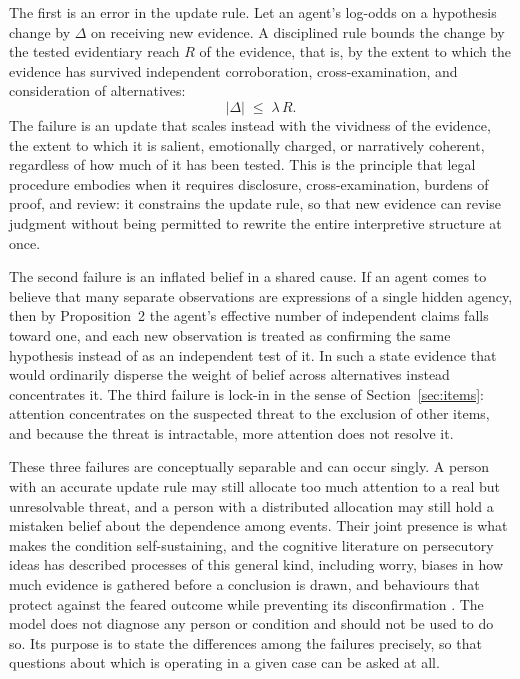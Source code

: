 \documentclass[11pt]{article}
\theoremstyle{definition}
\begin{document}
The first is an error in the update rule. Let an agent's log-odds on a hypothesis change by $\Delta$ on receiving new evidence. A disciplined rule bounds the change by the tested evidentiary reach $R$ of the evidence, that is, by the extent to which the evidence has survived independent corroboration, cross-examination, and consideration of alternatives:
\begin{equation}
|\Delta|\;\le\;\lambda\,R .
\label{eq:update}
\end{equation}
The failure is an update that scales instead with the vividness of the evidence, the extent to which it is salient, emotionally charged, or narratively coherent, regardless of how much of it has been tested. This is the principle that legal procedure embodies when it requires disclosure, cross-examination, burdens of proof, and review: it constrains the update rule, so that new evidence can revise judgment without being permitted to rewrite the entire interpretive structure at once.

The second failure is an inflated belief in a shared cause. If an agent comes to believe that many separate observations are expressions of a single hidden agency, then by Proposition~2 the agent's effective number of independent claims falls toward one, and each new observation is treated as confirming the same hypothesis instead of as an independent test of it. In such a state evidence that would ordinarily disperse the weight of belief across alternatives instead concentrates it. The third failure is lock-in in the sense of Section~\ref{sec:items}: attention concentrates on the suspected threat to the exclusion of other items, and because the threat is intractable, more attention does not resolve it.

These three failures are conceptually separable and can occur singly. A person with an accurate update rule may still allocate too much attention to a real but unresolvable threat, and a person with a distributed allocation may still hold a mistaken belief about the dependence among events. Their joint presence is what makes the condition self-sustaining, and the cognitive literature on persecutory ideas has described processes of this general kind, including worry, biases in how much evidence is gathered before a conclusion is drawn, and behaviours that protect against the feared outcome while preventing its disconfirmation \cite{freeman2007}. The model does not diagnose any person or condition and should not be used to do so. Its purpose is to state the differences among the failures precisely, so that questions about which is operating in a given case can be asked at all.
\end{document}
